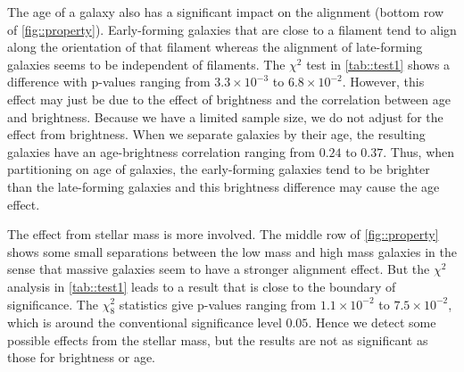 \documentclass[usenatbib,useAMS]{mnras}
\theoremstyle{remark}
\newcommand{\sukhdeep}[1]{{\textcolor{magenta}{SS: #1}}}
\newcommand{\jab}[1]{{\textcolor{red}{JAB: #1}}}
\begin{document}
{{%


The age of a galaxy also has a significant impact on the alignment (bottom row of \autoref{fig::property}).
Early-forming galaxies that are close to a filament tend to align
along the orientation of that filament whereas
the alignment of 
late-forming galaxies seems to be independent of filaments.
The $\chi^2$
test in \autoref{tab::test1} shows a difference with p-values
ranging from $3.3\times 10^{-3}$ to $6.8\times 10^{-2}$.
However, this effect may just be due to the effect of brightness and the correlation between age and brightness.
Because we have a limited sample size, we do not adjust for the effect from brightness.
When we separate galaxies by their age, the resulting galaxies have an age-brightness correlation ranging from $0.24$ to $0.37$. 
Thus, when partitioning on age of galaxies, the early-forming galaxies tend to be brighter than the late-forming galaxies
and this brightness difference may cause the age effect. 





The effect from stellar mass is more involved.
The middle row of \autoref{fig::property} shows some small separations between
the low mass and high mass galaxies in the sense that massive galaxies seem to have a stronger alignment 
effect.
But the $\chi^2$ analysis in \autoref{tab::test1} leads to a result that is close to the boundary
of significance.
The $\chi^2_8$ statistics give p-values ranging from $1.1\times10^{-2}$ to $7.5\times 10^{-2}$,
which is around the conventional significance level $0.05$. 
Hence we detect some possible effects from the stellar mass, but the results are not as significant
as those for brightness or age. 


}}
\end{document}
